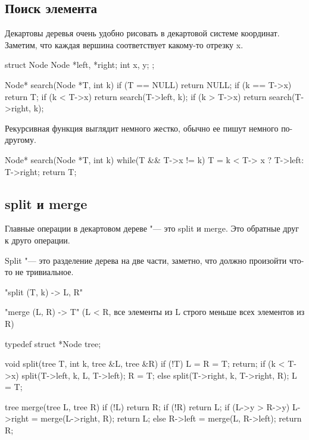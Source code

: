 \subsection{Поиск элемента}
Декартовы деревья очень удобно рисовать в декартовой системе координат.
Заметим, что каждая вершина соответствует какому-то отрезку x.     

\begin{cppcode}
struct Node {
     Node *left, *right;
     int x, y;
};

Node* search(Node *T, int k) {
    if (T == NULL) return NULL;
    if (k == T->x) return T; 
    if (k < T->x) return search(T->left, k);
    if (k > T->x) return search(T->right, k);
}
\end{cppcode}

Рекурсивная функция выглядит немного жестко, обычно ее пишут немного по-другому.

\begin{cppcode}
Node* search(Node *T, int k) {
    while(T && T->x != k) {
        T = k < T-> x ? T->left: T->right;
    }
    return T;
}

\end{cppcode} 

\subsection{split и merge}
Главные операции в декартовом дереве "--- это split и merge. Это обратные друг к друго операции. 

Split "--- это разделение дерева на две части, заметно, что должно произойти что-то не тривиальное.

\cpp"split (T, k) -> L, R"

\cpp"merge (L, R) -> T" (L < R, все элементы из L строго меньше всех элементов из R)

\begin{cppcode}
typedef struct *Node tree;

void split(tree T, int k, tree &L, tree &R) {
    if (!T) {
        L = R = T;
        return;
    }   
    if (k < T->x) {
        split(T->left, k, L, T->left);
        R = T;
    } else {
        split(T->right, k, T->right, R);
        L = T;
    }
}

tree merge(tree L, tree R) {
    if (!L) return R;
    if (!R) return L;
    if (L->y > R->y) {
        L->right = merge(L->right, R);
        return L;
    } else {
        R->left = merge(L, R->left);
        return R;
    }
}
\end{cppcode} 

